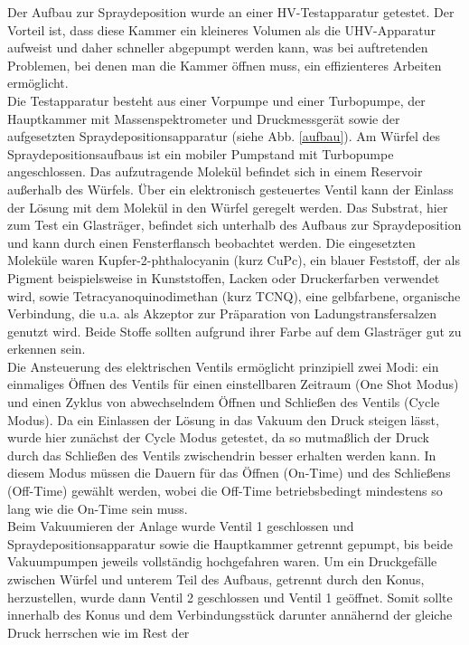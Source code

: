 Der Aufbau zur Spraydeposition wurde an einer HV-Testapparatur getestet. Der
Vorteil ist, dass diese Kammer ein kleineres Volumen als die UHV-Apparatur aufweist und daher
schneller abgepumpt werden kann, was bei auftretenden Problemen, bei denen man die Kammer öffnen
muss, ein effizienteres Arbeiten ermöglicht.
\\
Die Testapparatur besteht aus einer Vorpumpe und  einer Turbopumpe,
der Hauptkammer mit Massenspektrometer und Druckmessgerät sowie der aufgesetzten
Spraydepositionsapparatur (siehe Abb. \ref{aufbau}). Am Würfel des Spraydepositionsaufbaus ist ein
mobiler Pumpstand mit Turbopumpe angeschlossen.
Das aufzutragende Molekül befindet sich in einem Reservoir außerhalb des Würfels. Über ein
elektronisch gesteuertes Ventil kann der Einlass der Lösung mit dem Molekül in den Würfel geregelt
werden. Das Substrat, hier zum Test ein Glasträger, befindet sich unterhalb des Aufbaus zur
Spraydeposition und kann durch einen Fensterflansch beobachtet werden. Die eingesetzten Moleküle
waren Kupfer-2-phthalocyanin (kurz CuPc), ein blauer Feststoff, der als Pigment beispielsweise in
Kunststoffen, Lacken oder Druckerfarben verwendet wird, sowie 
Tetracyanoquinodimethan (kurz TCNQ), eine gelbfarbene,
organische Verbindung, die u.a. als Akzeptor zur Präparation von Ladungstransfersalzen genutzt wird.
Beide Stoffe sollten aufgrund ihrer Farbe auf dem Glasträger gut zu erkennen sein. 
\\
Die Ansteuerung des elektrischen Ventils ermöglicht
prinzipiell zwei Modi: ein einmaliges Öffnen des
Ventils für einen einstellbaren Zeitraum (One
Shot Modus) und einen Zyklus von abwechselndem
Öffnen und Schließen des Ventils (Cycle Modus).
Da ein Einlassen der Lösung in das Vakuum
den Druck steigen lässt, wurde hier
zunächst der Cycle Modus getestet, da so
mutmaßlich der Druck durch das Schließen des
Ventils zwischendrin besser erhalten werden
kann. In diesem Modus müssen die Dauern für das
Öffnen (On-Time) und des Schließens (Off-Time)
gewählt werden, wobei die Off-Time
betriebsbedingt mindestens so lang wie die
On-Time sein muss.
\\
Beim Vakuumieren der Anlage wurde Ventil 1  geschlossen und Spraydepositionsapparatur sowie die 
 Hauptkammer getrennt gepumpt, bis beide Vakuumpumpen jeweils vollständig hochgefahren
 waren. Um ein Druckgefälle zwischen Würfel und unterem Teil des Aufbaus, getrennt
 durch den Konus, herzustellen, wurde dann Ventil 2 geschlossen und Ventil 1 geöffnet. Somit sollte
 innerhalb des Konus und dem Verbindungsstück darunter annähernd der gleiche Druck herrschen wie im Rest der

